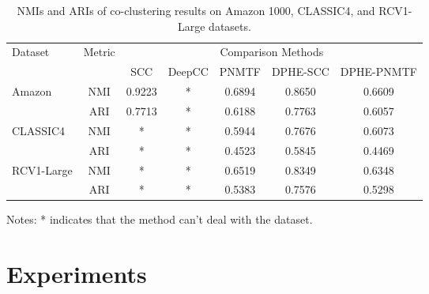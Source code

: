 \begin{table*}[htbp]
    \centering
    \caption{NMIs and ARIs of co-clustering results on Amazon 1000, CLASSIC4, and RCV1-Large datasets.}
    \label{tab:evaluation-metrics}
    \begin{tabular}{@{} l c ccccc @{}}
        \toprule
        \multirow{2}{*}{Dataset}    & \multirow{2}{*}{Metric} & \multicolumn{5}{c}{Comparison Methods}                                                         \\
        \cmidrule{3-7}
                                    &                         & SCC                                    & DeepCC & PNMTF  & DPHE-SCC & DPHE-PNMTF \\
        \midrule
        \multirow{2}{*}{Amazon}     & NMI                     & 0.9223                                 & *      & 0.6894 & 0.8650          & 0.6609            \\
                                    & ARI                     & 0.7713                                 & *      & 0.6188 & 0.7763          & 0.6057            \\
        \multirow{2}{*}{CLASSIC4}   & NMI                     & *                                      & *      & 0.5944 & 0.7676          & 0.6073            \\
                                    & ARI                     & *                                      & *      & 0.4523 & 0.5845          & 0.4469            \\
        \multirow{2}{*}{RCV1-Large} & NMI                     & *                                      & *      & 0.6519 & 0.8349          & 0.6348            \\
                                    & ARI                     & *                                      & *      & 0.5383 & 0.7576          & 0.5298            \\
        \bottomrule
    \end{tabular}
    \begin{tablenotes}
        \small
        \item Notes: * indicates that the method can't deal with the dataset.
    \end{tablenotes}
\end{table*}
\section{Experiments}
\label{sec:experiment}

